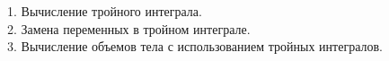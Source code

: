 \newcommand{\sphereFunction}{f \left(x (u,v,w), \ y(u,v,w), \ z(u,v,w) \right)}



1. Вычисление тройного интеграла. \\


2. Замена переменных в тройном интеграле. \\


3. Вычисление объемов тела с использованием тройных интегралов. \\
